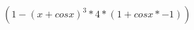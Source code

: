 \documentclass{proc}
\begin{document}
$ {( {  1  } - { { { {( {  x  } + {  cos {  x  } } )} ^ {  3  } } * {  4  } } * {( {  1  } + { {  cos {  x  } } * {  -1  } } )} } )} $
\end{document}
